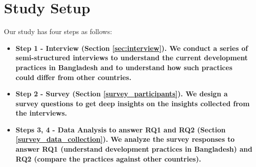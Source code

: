 \section{Study Setup}
\label{study_setup}

Our study has four steps as follows:
\begin{itemize}[leftmargin=10pt]
  \item\bf{Step 1 - Interview (Section \ref{sec:interview}).}  We conduct a series of semi-structured interviews to understand the current development practices in Bangladesh and to understand how 
  such practices could differ from other countries. 
  \item\bf{Step 2 - Survey (Section \ref{survey_participants}).} We design a survey questions to get deep insights on the insights collected from the interviews.  
  \item\bf{Steps 3, 4 - Data Analysis to answer RQ1 and RQ2 (Section \ref{survey_data_collection}).} We analyze the
  survey responses to answer RQ1 (understand development practices in
  Bangladesh) and RQ2 (compare the practices against other
  countries).
  
\end{itemize} %
